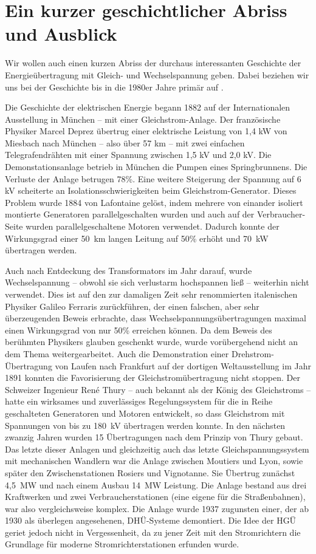 
\section{Ein kurzer geschichtlicher Abriss und Ausblick}
Wir wollen auch einen kurzen Abriss der durchaus interessanten Geschichte der Energieübertragung mit Gleich- und Wechselspannung geben. Dabei beziehen wir uns bei der Geschichte bis in die 1980er Jahre primär auf \cite{Schymroch}.

Die Geschichte der elektrischen Energie begann 1882 auf der Internationalen Ausstellung in München – mit einer Gleichstrom-Anlage. Der französische Physiker Marcel Deprez übertrug einer elektrische Leistung von 1,4 kW von Miesbach nach München – also über 57 km – mit zwei einfachen Telegrafendrähten mit einer Spannung zwischen 1,5 kV und 2,0 kV. Die Demonstationsanlage betrieb in München die Pumpen eines Springbrunnens. Die Verluste der Anlage betrugen 78\%. Eine weitere Steigerung der Spannung auf 6 kV scheiterte an Isolationsschwierigkeiten beim Gleichstrom-Generator. Dieses Problem wurde 1884 von Lafontaine gelöst, indem mehrere von einander isoliert montierte Generatoren parallelgeschalten wurden und auch auf der Verbraucher-Seite wurden parallelgeschaltene Motoren verwendet. Dadurch konnte der Wirkungsgrad einer 50\ km langen Leitung auf 50\% erhöht und 70\ kW übertragen werden.

Auch nach Entdeckung des Transformators im Jahr darauf, wurde Wechselspannung -- obwohl sie sich verlustarm hochspannen ließ -- weiterhin nicht verwendet.
Dies ist auf den zur damaligen Zeit sehr renommierten italenischen Physiker Galileo Ferraris zurückführen,
der einen falschen, aber sehr überzeugenden Beweis erbrachte, dass Wechselspannungsübertragungen maximal einen Wirkungsgrad von nur 50\% erreichen können.
Da dem Beweis des berühmten Physikers glauben geschenkt wurde, wurde vorübergehend nicht an dem Thema weitergearbeitet.
Auch die Demonstration einer Drehstrom-Übertragung von Laufen nach Frankfurt auf der dortigen Weltausstellung im Jahr 1891 konnten die Favorisierung der Gleichstromübertragung nicht stoppen.
Der Schweizer Ingenieur René Thury -- auch bekannt als der König des Gleichstroms -- hatte ein wirksames und zuverlässiges Regelungssystem für die in Reihe geschalteten Generatoren und Motoren entwickelt, so dass Gleichstrom mit Spannungen von bis zu 180\ kV übertragen werden konnte. In den nächsten zwanzig Jahren wurden 15 Übertragungen nach dem Prinzip von Thury gebaut. Das letzte dieser Anlagen und gleichzeitig auch das letzte Gleichspannungssystem mit mechanischen Wandlern war die Anlage zwischen Moutiers und Lyon, sowie später den Zwischenstationen Rosiers und Vignotanne. Sie Übertrug zunächst 4,5\ MW und nach einem Ausbau 14\ MW Leistung. Die Anlage bestand aus drei Kraftwerken und zwei Verbraucherstationen (eine eigene für die Straßenbahnen), war also vergleichsweise komplex. Die Anlage wurde 1937 zugunsten einer, der ab 1930 als überlegen angesehenen, DHÜ-Systeme demontiert. Die Idee der HGÜ geriet jedoch nicht in Vergessenheit, da zu jener Zeit mit den Stromrichtern die Grundlage für moderne Stromrichterstationen erfunden wurde.

